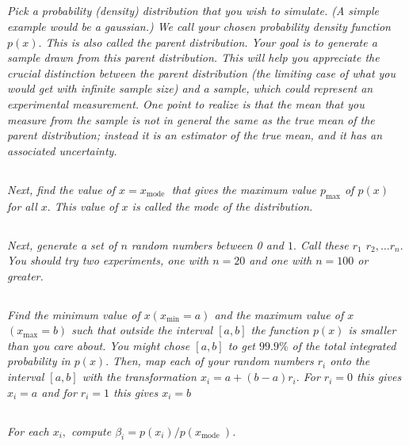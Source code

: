 \documentclass{article}
\begin{document}
\subsection{}
\textit{Pick a probability (density) distribution that you wish to simulate. (A simple example would be a gaussian.) We call your chosen probability density function $p(x) .$ This is also called the parent distribution. Your goal is to generate a sample drawn from this parent distribution. This will help you appreciate the crucial distinction between the parent distribution (the limiting case of what you would get with infinite sample size) and a sample, which could represent an experimental measurement. One point to realize is that the mean that you measure from the sample is not in general the same as the true mean of the parent distribution; instead it is an estimator of the true mean, and it has an associated uncertainty.}


\subsection{}
\textit{Next, find the value of $x=x_{\text {mode }}$ that gives the maximum value $p_{\max }$ of $p(x)$ for all $x .$ This value of $x$ is called the mode of the distribution.}


\subsection{}
\textit{Next, generate a set of $n$ random numbers between 0 and $1 .$ Call these $r_{1}$ $r_{2}, \ldots r_{n} .$ You should try two experiments, one with $n=20$ and one with $n=100$ or greater.}



\subsection{}
\textit{Find the minimum value of $x\left(x_{\min }=a\right)$ and the maximum value of $x$ $\left(x_{\max }=b\right)$ such that outside the interval $[a, b]$ the function $p(x)$ is smaller than you care about. You might chose $[a, b]$ to get $99.9 \%$ of the total integrated probability in $p(x) .$ Then, map each of your random numbers $r_{i}$ onto the interval $[a, b]$ with the transformation $x_{i}=a+(b-a) r_{i} .$ For $r_{i}=0$ this gives $x_{i}=a$ and for $r_{i}=1$ this gives $x_{i}=b$}



\subsection{}
\textit{For each $x_{i},$ compute $\beta_{i}=p\left(x_{i}\right) / p\left(x_{\text {mode }}\right)$.}
\end{document}
